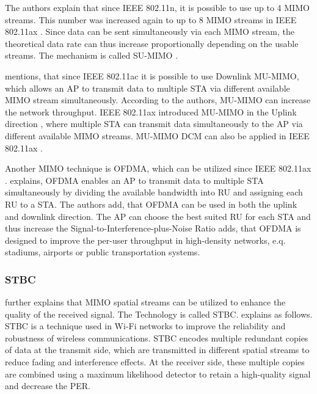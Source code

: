 The authors explain that since IEEE 802.11n, it is possible to use up to \num{4} MIMO streams.
This number was increased again to up to \num{8} MIMO streams in IEEE 802.11ax \cite{noauthor_ieee_2021}.
Since data can be sent simultaneously via each MIMO stream,
the theoretical data rate can thus increase proportionally depending on the usable streams.
The mechanism is called \ac{SU}-\ac{MIMO} \cite{noauthor_ieee_2021}.

\textcite{sauter_wireless_2022} mentions, that since IEEE 802.11ac it is possible to use Downlink \ac{MU}-\ac{MIMO},
which allows an \ac{AP} to transmit data to multiple \ac{STA} via different available \ac{MIMO} stream simultaneously.
According to the authors, \ac{MU}-\ac{MIMO} can increase the network throughput.
IEEE 802.11ax introduced \ac{MU}-\ac{MIMO} in the Uplink direction \cite{noauthor_ieee_2021}, where multiple \ac{STA} can transmit data simultaneously to the \ac{AP} via different available \ac{MIMO} streams.
MU-\ac{MIMO} DCM can also be applied in IEEE 802.11ax \cite{noauthor_ieee_2021}.

Another \ac{MIMO} technique is \ac{OFDMA}, which can be utilized since IEEE 802.11ax \cite{noauthor_ieee_2021, avallone_will_2021, omar_survey_2016}.
\textcite{avallone_will_2021} explains, \ac{OFDMA} enables an \ac{AP} to transmit data to multiple \ac{STA} simultaneously by dividing the available bandwidth into \ac{RU} and assigning each \ac{RU} to a \ac{STA}.
The authors add, that \ac{OFDMA} can be used in both the uplink and downlink direction.
The \ac{AP} can choose the best suited \ac{RU} for each \ac{STA} and thus increase the Signal-to-Interference-plus-Noise Ratio \cite{khorov_tutorial_2019}
\textcite{behara_performance_2022} adds, that \ac{OFDMA} is designed to improve the per-user throughput in high-density networks, e.q.
stadiums, airports or public transportation systems.

\subsubsection*{\acf{STBC}}
\textcite{abbas_efficient_2016} further explains that \ac{MIMO} spatial streams can be utilized to enhance the
quality of the received signal.
The Technology is called \ac{STBC}.
\textcite{santumon_space-time_2012} explains as follows.
\ac{STBC} is a technique used in Wi-Fi networks to improve the reliability and robustness of wireless communications.
\ac{STBC} encodes multiple redundant copies of data at the transmit side, which are transmitted in different spatial streams to
reduce fading and interference effects.
At the receiver side, these multiple copies are combined using a maximum likelihood detector
to retain a high-quality signal and decrease the \ac{PER}.


